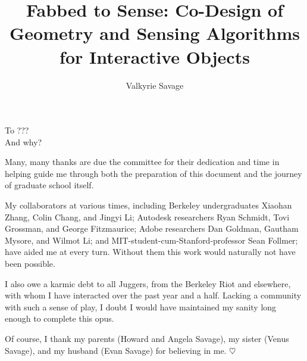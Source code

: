 \documentclass[oldfontcommands]{ucbthesis}
\begin{document}



\title{Fabbed to Sense: Co-Design of Geometry and Sensing Algorithms for Interactive Objects}
\author{Valkyrie Savage}

\maketitle
\approvalpage
\copyrightpage



\begin{frontmatter}

\begin{dedication}
\null\vfil
\begin{center}
To ???\\\vspace{12pt}
And why?
\end{center}
\vfil\null
\end{dedication}

\tableofcontents
\clearpage
\listoffigures
\clearpage
\listoftables

\begin{acknowledgements}
Many, many thanks are due the committee for their dedication and time in helping guide me through both the preparation of this document and the journey of graduate school itself. 

My collaborators at various times, including Berkeley undergraduates Xiaohan Zhang, Colin Chang, and Jingyi Li; Autodesk researchers Ryan Schmidt, Tovi Grossman, and George Fitzmaurice; Adobe researchers Dan Goldman, Gautham Mysore, and Wilmot Li; and MIT-student-cum-Stanford-professor Sean Follmer; have aided me at every turn. Without them this work would naturally not have been possible.

I also owe a karmic debt to all Juggers, from the Berkeley Riot and elsewhere, with whom I have interacted over the past year and a half. Lacking a community with such a sense of play, I doubt I would have maintained my sanity long enough to complete this opus.

Of course, I thank my parents (Howard and Angela Savage), my sister (Venus Savage), and my husband (Evan Savage) for believing in me. $\heartsuit$
\end{acknowledgements}

\end{frontmatter}

\pagestyle{headings}











\printbibliography
\end{document}
